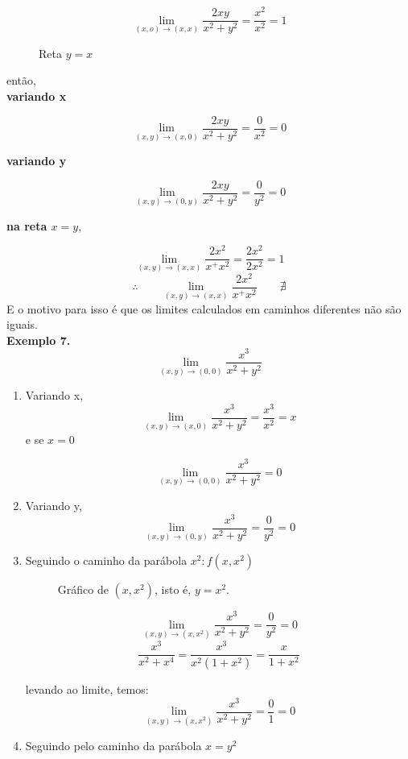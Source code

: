 \[\lim_{(x,o)\rightarrow(x,x)}\frac{2xy}{x^2+y^2}=\frac{x^2}{x^2}=1\]
\begin{figure}[H]
  \centering
  \caption{Reta $y=x$}
  \label{gráfico da reta xy}
\end{figure}

então,\\
\textbf{variando x}

\[\lim_{(x,y)\to(x,0)}\frac{2xy}{x^2+y^2}=\frac{0}{x^2}=0\]

\textbf{variando y}

\[\lim_{(x,y)\to(0,y)}\frac{2xy}{x^2+y^2}=\frac{0}{y^2}=0\]

\textbf{na reta $x=y$},

\[\lim_{(x,y)\rightarrow(x,x)}\frac{2x^2}{x^+x^2}=\frac{2x^2}{2x^2}=1\]
\[\therefore\qquad\lim_{(x,y)\rightarrow(x,x)}\frac{2x^2}{x^+x^2}\qquad\nexists\]
E o motivo para isso é que os limites calculados em caminhos diferentes não
são iguais.\\
\medskip
\textbf{Exemplo 7.}
\[\lim_{(x,y)\rightarrow(0,0)}\frac{x^3}{x^2+y^2}\]

\begin{enumerate}
    \item Variando x,
    \[\lim_{(x,y)\to(x,0)}\frac{x^3}{x^2+y^2}=\frac{x^3}{x^2}=x\]
    e se $x=0$
    
    \[\lim_{(x,y)\rightarrow(0,0)}\frac{x^3}{x^2+y^2}=0\]
    \item Variando y,
    \[\lim_{(x,y)\rightarrow(0,y)}\frac{x^3}{x^2+y^2}=\frac{0}{y^2}=0\]
    \item Seguindo o caminho da parábola $x^2:f(x,x^2)$
    
    \begin{figure}[H]
\centering
{}
\caption{Gráfico de $(x, x^2)$, isto é, $y=x^2$.}
\end{figure}
\[\lim_{(x,y)\rightarrow(x,x^2)}\frac{x^3}{x^2+y^2}=\frac{0}{y^2}=0\]
\[\frac{x^3}{x^2+x^4}=\frac{x^3}{x^2(1+x^2)}=\frac{x}{1+x^2}\]

levando ao limite, temos:
\[\lim_{(x,y)\rightarrow(x,x^2)}\frac{x^3}{x^2+y^2}=\frac{0}{1}=0\]

\item Seguindo pelo caminho da parábola $x=y^2$
\end{enumerate}

